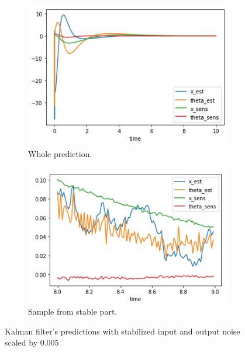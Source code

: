 \documentclass[12pt,letterpaper]{article}
\begin{document}
    \begin{figure}[htb]
        \begin{subfigure}{.5\textwidth}
            \centering
        \includegraphics[width=1\linewidth]{images/filter/kalman.jpg}
        \caption{Whole prediction.}
        \label{fig:output_noise_0005_filtered_whole}
        \end{subfigure}
        \begin{subfigure}{.5\textwidth}
          \centering
          \includegraphics[width=1\linewidth]{images/filter/kalman_sample.jpg}
          \caption{Sample from stable part.}
        \label{fig:output_noise_0005_filtered_sample}
        \end{subfigure}
    \caption{Kalman filter's predictions with stabilized input and output noise scaled by 0.005}
    \label{fig:output_noise_0005_filtered}
    \end{figure}
    
\end{document}
